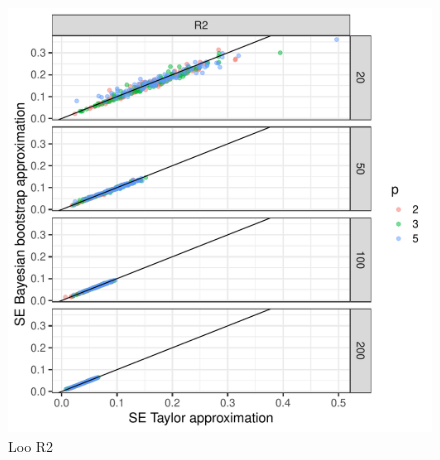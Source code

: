 \documentclass{article}
\begin{document}
\begin{figure}[!htb]
    \centering
    \includegraphics[width=\textwidth]{loo_r2.pdf}
    \caption{Loo R2}
    \label{fig:loo-r2-plot}
\end{figure}

\newpage


\end{document}

